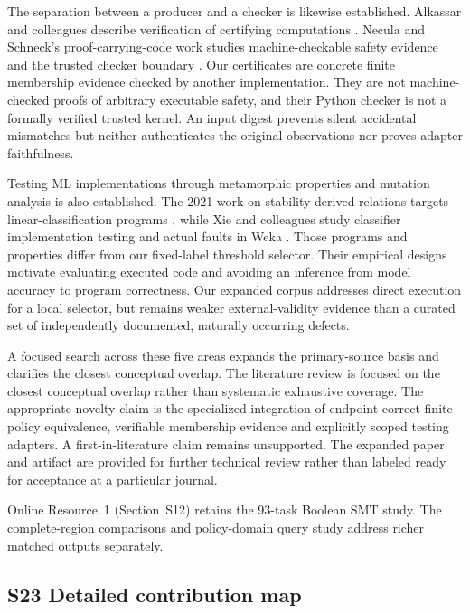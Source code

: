 \documentclass[11pt,a4paper]{article}
\theoremstyle{plain}
\theoremstyle{definition}
\theoremstyle{remark}
\begin{document}
The separation between a producer and a checker is likewise established. Alkassar and colleagues describe verification of certifying computations \cite{alkassar2013framework}. Necula and Schneck's proof-carrying-code work studies machine-checkable safety evidence and the trusted checker boundary \cite{necula2002proof}. Our certificates are concrete finite membership evidence checked by another implementation. They are not machine-checked proofs of arbitrary executable safety, and their Python checker is not a formally verified trusted kernel. An input digest prevents silent accidental mismatches but neither authenticates the original observations nor proves adapter faithfulness.

Testing ML implementations through metamorphic properties and mutation analysis is also established. The 2021 work on stability-derived relations targets linear-classification programs \cite{yang2021towards}, while Xie and colleagues study classifier implementation testing and actual faults in Weka \cite{xie2011testing}. Those programs and properties differ from our fixed-label threshold selector. Their empirical designs motivate evaluating executed code and avoiding an inference from model accuracy to program correctness. Our expanded corpus addresses direct execution for a local selector, but remains weaker external-validity evidence than a curated set of independently documented, naturally occurring defects.

A focused search across these five areas expands the primary-source basis and clarifies the closest conceptual overlap. The literature review is focused on the closest conceptual overlap rather than systematic exhaustive coverage. The appropriate novelty claim is the specialized integration of endpoint-correct finite policy equivalence, verifiable membership evidence and explicitly scoped testing adapters. A first-in-literature claim remains unsupported. The expanded paper and artifact are provided for further technical review rather than labeled ready for acceptance at a particular journal.

Online Resource~1 (Section~S12) retains the 93-task Boolean SMT study. The complete-region comparisons and policy-domain query study address richer matched outputs separately.


\subsection*{S23 Detailed contribution map}\label{sec:s23}
\end{document}
